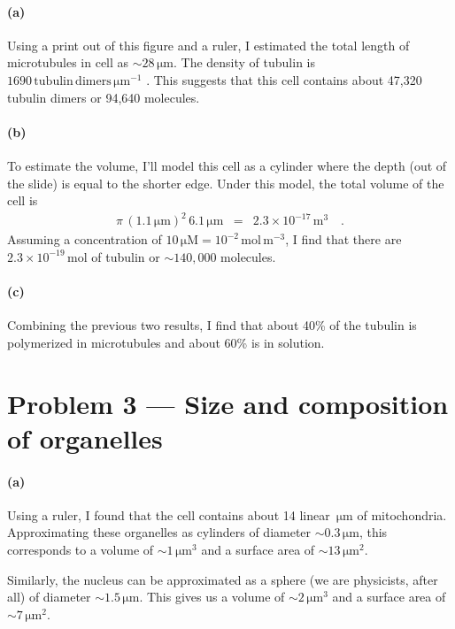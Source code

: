 \documentclass[11pt]{article}
\newcommand{\unit}[1]{\ensuremath{\,\mathrm{#1}}}
\begin{document}
\paragraph{(a)}
Using a print out of this figure and a ruler, I estimated the total length of
microtubules in cell as $\sim28\unit{\mu m}$.
The density of tubulin is $1690 \unit{tubulin\,dimers\,\mu m^{-1}}$
\cite{mtiv,amos}.
This suggests that this cell contains about 47,320 tubulin dimers or 94,640
molecules.

\paragraph{(b)}
To estimate the volume, I'll model this cell as a cylinder where the depth
(out of the slide) is equal to the shorter edge.
Under this model, the total volume of the cell is
\begin{eqnarray}
\pi \, (1.1\unit{\mu m})^2 \, 6.1\unit{\mu m} &=& 2.3\times 10^{-17} \unit{m^3}
\quad.
\end{eqnarray}
Assuming a concentration of $10\unit{\mu M} = 10^{-2}\unit{mol\,m^{-3}}$, I
find that there are $2.3\times10^{-19}\unit{mol}$ of tubulin or $\sim140,000$
molecules.

\paragraph{(c)}
Combining the previous two results, I find that about 40\% of the tubulin is
polymerized in microtubules and about 60\% is in solution.


\section{Problem 3 --- Size and composition of organelles}

\paragraph{(a)}
Using a ruler, I found that the cell contains about 14 linear $\unit{\mu m}$
of mitochondria.
Approximating these organelles as cylinders of diameter $\sim0.3\unit{\mu m}$,
this corresponds to a volume of $\sim 1 \unit{\mu m}^3$ and a surface area of
$\sim 13 \unit{\mu m}^2$.

Similarly, the nucleus can be approximated as a sphere (we are physicists,
after all) of diameter $\sim 1.5 \unit{\mu m}$.
This gives us a volume of $\sim 2 \unit{\mu m}^3$ and a surface area of $\sim
7 \unit{\mu m}^2$.
\end{document}

